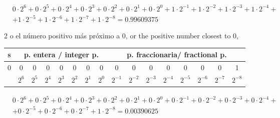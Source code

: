 \begin{equation*}
\begin{split}
&0\cdot 2^6+0 \cdot 2^5+ 0\cdot 2^4+ 0\cdot 2^3+ 0\cdot 2^2 + 0\cdot 2^1 + 0 \cdot 2^0 + 1 \cdot 2^{-1}+ 1 \cdot 2^{-2}+ 1 \cdot 2^{-3}+ 1 \cdot 2^{-4}+ \\
&+1 \cdot 2^{-5}+1 \cdot 2^{-6} +1 \cdot 2^{-7}+1 \cdot 2^{-8} =  0.99609375
\end{split}
\end{equation*}

\begin{paracol}{2}
o el número positivo más próximo a 0,
\switchcolumn
or the positive number closest to 0,
\end{paracol}

\begin{center}
\begin{tabular}{|c||c|c|c|c|c|c|c||c|c|c|c|c|c|c|c|}
\hline
s&\multicolumn{7}{c||}{p. entera / integer p.}&\multicolumn{8}{c|}{p. fraccionaria/ fractional p.}\\
\hline
0&0&0&0&0&0&0&0&0&0&0&0&0&0&0&1\\
\hline
&$2^{6}$&$2^{5}$&$2^{4}$&$2^{3}$&$2^{2}$&$2^{1}$&$2^{0}$&$2^{-1}$&$2^{-2}$&$2^{-3}$&$2^{-4}$&$2^{-5}$&$2^{-6}$&$2^{-7}$&$2^{-8}$\\
\hline
\end{tabular}
\end{center}

\begin{equation*}
\begin{split}
&0\cdot 2^6+0 \cdot 2^5+ 0\cdot 2^4+ 0\cdot 2^3+ 0\cdot 2^2 + 0\cdot 2^1 + 0 \cdot 2^0 + 0 \cdot 2^{-1}+ 0 \cdot 2^{-2}+ 0 \cdot 2^{-3}+0 \cdot 2^{-4}+\\
&+ 0 \cdot 2^{-5}+0 \cdot 2^{-6} +0 \cdot 2^{-7}+1 \cdot 2^{-8} =  0.00390625
\end{split}
\end{equation*}

